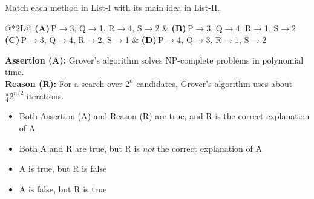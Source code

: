 \documentclass[11pt,a4paper]{article}
\newcommand{\optlabel}[1]{\textbf{(#1)}}
\newenvironment{qitem}[1]{\begin{list}{}{\setlength{\leftmargin}{3.3em}\setlength{\labelwidth}{3.1em}%
  \setlength{\labelsep}{0.2em}\setlength{\topsep}{3pt}\setlength{\parsep}{3pt}}\item[\textbf{Q.#1}\hfill]}{\end{list}}
\newcommand{\qsep}{\par\vspace{2pt}{\color{black!15}\hrule}\vspace{4pt}}
\begin{document}
\begin{qitem}{76}
Match each method in List-I with its main idea in List-II.
\par\smallskip{}
\par\smallskip\noindent\begin{tabularx}{\linewidth}{@{}*{2}{L}@{}}
\optlabel{A}\,P$\to$3, Q$\to$1, R$\to$4, S$\to$2 & \optlabel{B}\,P$\to$3, Q$\to$4, R$\to$1, S$\to$2 \\[3pt]
\optlabel{C}\,P$\to$3, Q$\to$4, R$\to$2, S$\to$1 & \optlabel{D}\,P$\to$4, Q$\to$3, R$\to$1, S$\to$2
\end{tabularx}
\end{qitem}
\qsep

\begin{qitem}{77}
\textbf{Assertion (A):} Grover's algorithm solves NP-complete problems in polynomial time.\\[1mm]
\textbf{Reason (R):} For a search over $2^n$ candidates, Grover's algorithm uses about $\frac\pi4 2^{n/2}$ iterations.
\begin{itemize}[leftmargin=2.6em, labelsep=0.4em, itemsep=2pt, topsep=3pt]
\item[\optlabel{A}] Both Assertion (A) and Reason (R) are true, and R is the correct explanation of A
\item[\optlabel{B}] Both A and R are true, but R is \emph{not} the correct explanation of A
\item[\optlabel{C}] A is true, but R is false
\item[\optlabel{D}] A is false, but R is true
\end{itemize}
\end{qitem}
\qsep
\end{document}
